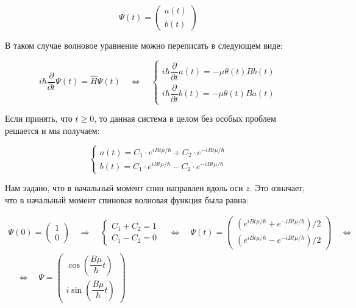 \documentclass[a4paper, 12pt]{article}
\newcommand{\qrq}
{\ensuremath{\quad \Rightarrow \quad}} %
\newcommand{\qlrq}
{\ensuremath{\quad \Leftrightarrow \quad}} %
\begin{document}
\begin{equation*}
	\Psi(t) = 
	\begin{pmatrix}
		a(t) \\
		b(t)
	\end{pmatrix}
\end{equation*}

В таком случае волновое уравнение можно переписать в следующем виде:

\begin{equation}
	i \hbar \frac{\partial}{\partial t} \Psi(t) = \hat{H} \Psi(t) \qlrq 
	\begin{cases*}
		i \hbar \dfrac{\partial}{\partial t} a(t)  = - \mu \theta(t) B b(t)\\
		i \hbar \dfrac{\partial}{\partial t} b(t)  = -\mu \theta(t) B a(t)
	\end{cases*}
\end{equation}

Если принять, что $t \ge 0$, то данная система в целом без особых проблем решается и мы получаем:

\begin{equation*}
	\begin{cases*}
	a(t) = C_1 \cdot e^{i B t \mu / \hbar} + C_2 \cdot e^{-i B t \mu / \hbar}\\
	b(t) = C_1 \cdot e^{i B t \mu / \hbar} - C_2 \cdot e^{-i B t \mu / \hbar}
	\end{cases*}
\end{equation*}

Нам задано, что в начальный момент спин направлен вдоль оси $z$. Это означает, что в начальный момент спиновая волновая функция была равна:

\begin{align*}
	\Psi(0) = 
	\begin{pmatrix}
	1 \\
	0
	\end{pmatrix} 
	\qrq 
	\begin{cases*}
		C_1 + C_2 = 1\\
		C_1 - C_2 = 0
	\end{cases*}
	\qlrq 
	\Psi(t) = 
	\begin{pmatrix}
		\left(e^{i B t \mu / \hbar} + e^{-i B t \mu / \hbar}\right)/2\\
		\left(e^{i B t \mu / \hbar} - e^{-i B t \mu / \hbar}\right)/2
	\end{pmatrix}
	\qlrq \\
	\qlrq \boxed{\Psi = 
	\begin{pmatrix}
		\cos\left(\dfrac{B\mu}{\hbar} t\right)\\
		i \sin\left(\dfrac{B\mu}{\hbar} t\right)
	\end{pmatrix}}
\end{align*}
\end{document}
